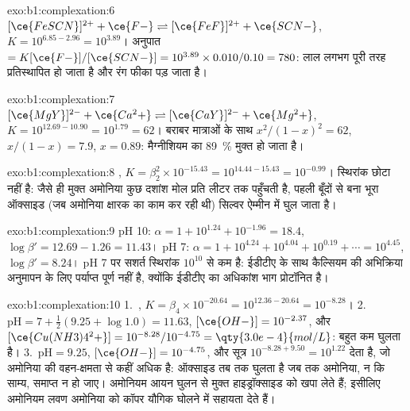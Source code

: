 \begin{solution}{exo:b1:complexation:6}
$[\ce{FeSCN}]^{2+} + \ce{F-} \rightleftharpoons [\ce{FeF}]^{2+} + \ce{SCN-}$,
$K = 10^{6.85 - 2.96} = 10^{3.89}$। अनुपात $= K[\ce{F-}]/[\ce{SCN-}] =
10^{3.89} \times 0.010/0.10 = 780$: लाल  लगभग पूरी तरह
प्रतिस्थापित हो जाता है और रंग फीका पड़ जाता है।
\end{solution}

\begin{solution}{exo:b1:complexation:7}
$[\ce{MgY}]^{2-} + \ce{Ca^2+} \rightleftharpoons [\ce{CaY}]^{2-} + \ce{Mg^2+}$,
$K = 10^{12.69 - 10.90} = 10^{1.79} = 62$। बराबर मात्राओं के साथ
$x^2/(1 - x)^2 = 62$, $x/(1 - x) = 7.9$, $x = 0.89$: मैग्नीशियम का
\qty{89}{\percent} मुक्त हो जाता है।
\end{solution}

\begin{solution}{exo:b1:complexation:8}
, $K = \beta_2^2 \times
10^{-15.43} = 10^{14.44 - 15.43} = 10^{-0.99}$। स्थिरांक
छोटा नहीं है: जैसे ही मुक्त अमोनिया कुछ दशांश मोल प्रति लीटर तक पहुँचती है,
पहली बूँदों से बना भूरा ऑक्साइड (जब अमोनिया क्षारक का काम कर रही थी)
सिल्वर ऐम्मीन में घुल जाता है।
\end{solution}

\begin{solution}{exo:b1:complexation:9}
pH 10: $\alpha = 1 + 10^{1.24} + 10^{-1.96} = 18.4$, $\log\beta' = 12.69 -
1.26 = 11.43$। pH 7: $\alpha = 1 + 10^{4.24} + 10^{4.04} + 10^{0.19} +
\cdots = 10^{4.45}$, $\log\beta' = 8.24$। pH 7 पर सशर्त स्थिरांक
$10^{10}$ से कम है: ईडीटीए के साथ कैल्सियम की अभिक्रिया अनुमापन के लिए
पर्याप्त पूर्ण नहीं है, क्योंकि ईडीटीए का अधिकांश भाग प्रोटॉनित है।
\end{solution}

\begin{solution}{exo:b1:complexation:10}
1.~, $K = \beta_4 \times
10^{-20.64} = 10^{12.36 - 20.64} = 10^{-8.28}$।
2.~$\mathrm{pH} = 7 + \frac12(9.25 + \log 1.0) = 11.63$, $[\ce{OH-}] =
10^{-2.37}$, और $[\ce{Cu(NH3)4^2+}] = 10^{-8.28}/10^{-4.75} =
\qty{3.0e-4}{mol/L}$: बहुत कम घुलता है।
3.~$\mathrm{pH} = 9.25$, $[\ce{OH-}] = 10^{-4.75}$, और सूत्र
$10^{-8.28 + 9.50} = 10^{1.22}$ देता है, जो अमोनिया की वहन-क्षमता से कहीं अधिक है:
ऑक्साइड तब तक घुलता है जब तक अमोनिया, न कि साम्य, समाप्त न हो जाए।
अमोनियम आयन घुलन से मुक्त हाइड्रॉक्साइड को खपा लेते हैं; इसीलिए
अमोनियम लवण अमोनिया को कॉपर यौगिक घोलने में सहायता देते हैं।
\end{solution}

